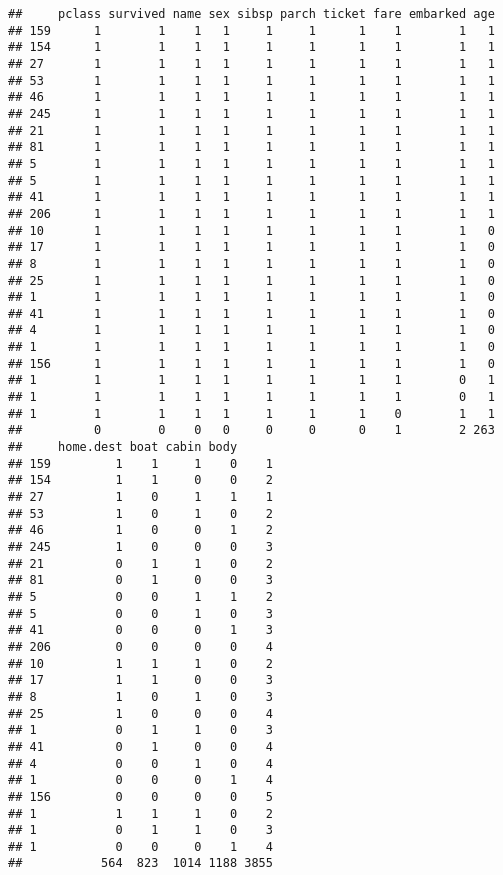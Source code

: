 \documentclass[]{article}
\begin{document}
\begin{verbatim}
##     pclass survived name sex sibsp parch ticket fare embarked age
## 159      1        1    1   1     1     1      1    1        1   1
## 154      1        1    1   1     1     1      1    1        1   1
## 27       1        1    1   1     1     1      1    1        1   1
## 53       1        1    1   1     1     1      1    1        1   1
## 46       1        1    1   1     1     1      1    1        1   1
## 245      1        1    1   1     1     1      1    1        1   1
## 21       1        1    1   1     1     1      1    1        1   1
## 81       1        1    1   1     1     1      1    1        1   1
## 5        1        1    1   1     1     1      1    1        1   1
## 5        1        1    1   1     1     1      1    1        1   1
## 41       1        1    1   1     1     1      1    1        1   1
## 206      1        1    1   1     1     1      1    1        1   1
## 10       1        1    1   1     1     1      1    1        1   0
## 17       1        1    1   1     1     1      1    1        1   0
## 8        1        1    1   1     1     1      1    1        1   0
## 25       1        1    1   1     1     1      1    1        1   0
## 1        1        1    1   1     1     1      1    1        1   0
## 41       1        1    1   1     1     1      1    1        1   0
## 4        1        1    1   1     1     1      1    1        1   0
## 1        1        1    1   1     1     1      1    1        1   0
## 156      1        1    1   1     1     1      1    1        1   0
## 1        1        1    1   1     1     1      1    1        0   1
## 1        1        1    1   1     1     1      1    1        0   1
## 1        1        1    1   1     1     1      1    0        1   1
##          0        0    0   0     0     0      0    1        2 263
##     home.dest boat cabin body     
## 159         1    1     1    0    1
## 154         1    1     0    0    2
## 27          1    0     1    1    1
## 53          1    0     1    0    2
## 46          1    0     0    1    2
## 245         1    0     0    0    3
## 21          0    1     1    0    2
## 81          0    1     0    0    3
## 5           0    0     1    1    2
## 5           0    0     1    0    3
## 41          0    0     0    1    3
## 206         0    0     0    0    4
## 10          1    1     1    0    2
## 17          1    1     0    0    3
## 8           1    0     1    0    3
## 25          1    0     0    0    4
## 1           0    1     1    0    3
## 41          0    1     0    0    4
## 4           0    0     1    0    4
## 1           0    0     0    1    4
## 156         0    0     0    0    5
## 1           1    1     1    0    2
## 1           0    1     1    0    3
## 1           0    0     0    1    4
##           564  823  1014 1188 3855
\end{verbatim}
\end{document}
